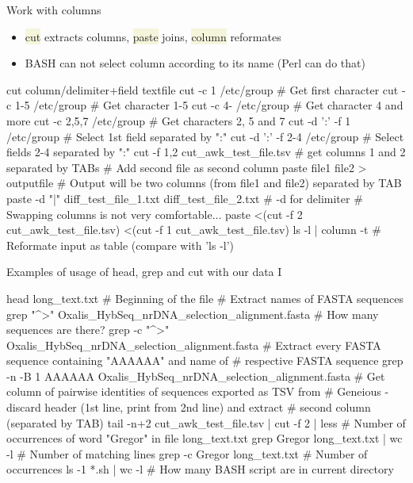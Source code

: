 \documentclass[compress, ucs, xelatex, 11pt, xcolor=svgnames, aspectratio=169,
	hyperref={
		bookmarks=true,
		unicode=true,
		colorlinks=true,
		pdftitle={Linux, command line and MetaCentrum},
		plainpages=false,
		pdfauthor={Vojtech Zeisek},
		pdfsubject={Course about use of Linux command line, writing shell scripts and using MetaCentrum of CESNET},
		pdfcreator={XeLaTeX},
		pdfkeywords={Linux, GNU, BASH, shell, command line, MetaCentrum},
		linkcolor=DarkRed, %
		anchorcolor=DarkBlue, %
		citecolor=Indigo, %
		filecolor=NavyBlue, %
		menucolor=DarkMagenta, %
		urlcolor=DarkBlue, %
		pdftex},
	url={hyphens, lowtilde} %
	]{beamer}
\renewcommand{\texttt}[1]{\colorbox{Beige}{{\ttfamily #1}}}
\begin{document}
\begin{frame}[fragile]{Work with columns}
	\label{cutpaste}
	\begin{itemize}
		\item \texttt{cut} extracts columns, \texttt{paste} joins, \texttt{column} reformates
		\item BASH can not select column according to its name (Perl can do that)
	\end{itemize}
	\vfill
	\begin{bashcode}
    cut column/delimiter+field textfile
    cut -c 1 /etc/group # Get first character
    cut -c 1-5 /etc/group # Get character 1-5
    cut -c 4- /etc/group # Get character 4 and more
    cut -c 2,5,7 /etc/group # Get characters 2, 5 and 7
    cut -d ':' -f 1 /etc/group # Select 1st field separated by ":"
    cut -d ':' -f 2-4 /etc/group # Select fields 2-4 separated by ":"
    cut -f 1,2 cut_awk_test_file.tsv # get columns 1 and 2 separated by TABs
    # Add second file as second column
    paste file1 file2 > outputfile
    # Output will be two columns (from file1 and file2) separated by TAB
    paste -d "|" diff_test_file_1.txt diff_test_file_2.txt # -d for delimiter
    # Swapping columns is not very comfortable...
    paste <(cut -f 2 cut_awk_test_file.tsv) <(cut -f 1 cut_awk_test_file.tsv)
    ls -l | column -t # Reformate input as table (compare with 'ls -l')
	\end{bashcode}
\end{frame}

\begin{frame}[fragile]{Examples of usage of head, grep and cut with our data I}
	\begin{bashcode}
    head long_text.txt # Beginning of the file
    # Extract names of FASTA sequences
    grep "^>" Oxalis_HybSeq_nrDNA_selection_alignment.fasta
    # How many sequences are there?
    grep -c "^>" Oxalis_HybSeq_nrDNA_selection_alignment.fasta
    # Extract every FASTA sequence containing "AAAAAA" and name of
    # respective FASTA sequence
    grep -n -B 1 AAAAAA Oxalis_HybSeq_nrDNA_selection_alignment.fasta
    # Get column of pairwise identities of sequences exported as TSV from
    # Geneious - discard header (1st line, print from 2nd line) and extract
    # second column (separated by TAB)
    tail -n+2 cut_awk_test_file.tsv | cut -f 2 | less
    # Number of occurrences of word "Gregor" in file long_text.txt
    grep Gregor long_text.txt | wc -l # Number of matching lines
    grep -c Gregor long_text.txt # Number of occurrences
    ls -1 *.sh | wc -l # How many BASH script are in current directory
	\end{bashcode}
\end{frame}
\end{document}
